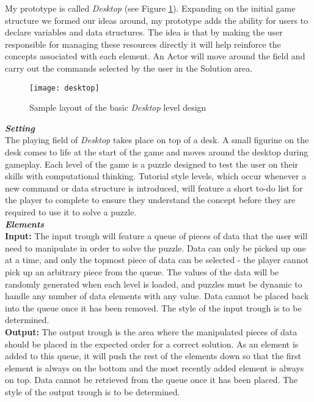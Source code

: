 My prototype is called \textit{Desktop} (see Figure \ref{fig:desktop}). Expanding on the initial game structure we formed 
our ideas around, my prototype adds the ability for users to declare variables and data structures. The idea 
is that by making the user responsible for managing these resources directly it will help reinforce the concepts 
associated with each element. An Actor will move around the field and carry out the  commands selected by 
the user in the Solution area.\\

\begin{figure}[!hb]
	\centering
	\texttt{[image: desktop]}
	\caption{Sample layout of the basic \textit{Desktop} level design}
	\label{fig:desktop}
\end{figure}

\textbf{\textit{Setting}}\\
The playing field of \textit{Desktop} takes place on top of a desk. A small figurine on the desk comes to life at the start 
of the game and moves around the desktop during gameplay. Each level of the game is a puzzle designed to 
test the user on their skills with computational thinking. Tutorial style levels, which occur whenever a new 
command or data structure is introduced, will feature a short to-do list for the player to complete to ensure they
 understand the concept before they are required to use it to solve a puzzle.\\

\textbf{\textit{Elements}}\\
\textbf{Input:}
The input trough will feature a queue of pieces of data that the user will need to manipulate in order to solve 
the puzzle. Data can only be picked up one at a time, and only the topmost piece of data can be selected - the 
player cannot pick up an arbitrary piece from the queue. The values of the data will be randomly generated 
when each level is loaded, and puzzles must be dynamic to handle any number of data elements with any value. 
Data cannot be placed back into the queue once it has been removed. The style of the input trough is to be 
determined.\\

\textbf{Output:}
The output trough is the area where the manipulated pieces of data should be placed in the expected order 
for a correct solution. As an element is added to this queue, it will push the rest of the elements down so that 
the first element is always on the bottom and the most recently added element is always on top. Data cannot 
be retrieved from the queue once it has been placed. The style of the output trough is to be determined.\\

